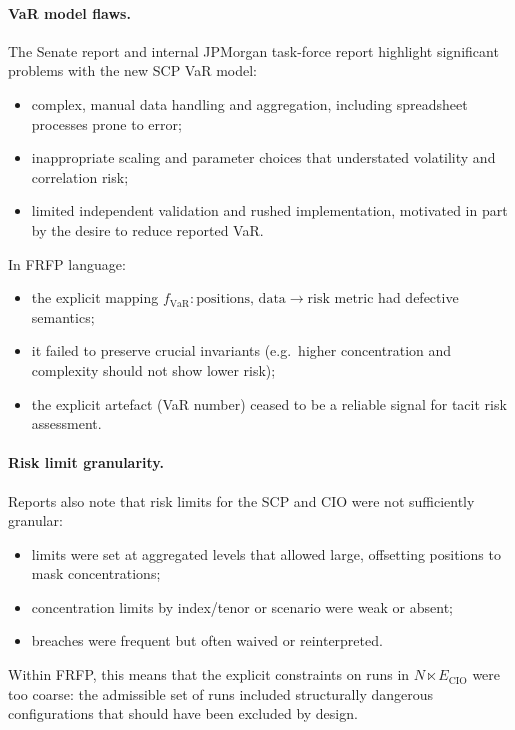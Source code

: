 \paragraph{VaR model flaws.}
The Senate report and internal JPMorgan task-force report highlight
significant problems with the new SCP VaR model:

\begin{itemize}
  \item complex, manual data handling and aggregation, including spreadsheet
        processes prone to error;
  \item inappropriate scaling and parameter choices that understated
        volatility and correlation risk;
  \item limited independent validation and rushed implementation, motivated
        in part by the desire to reduce reported VaR.
\end{itemize}

In FRFP language:

\begin{itemize}
  \item the explicit mapping
        \(
          f_{\mathrm{VaR}} : \text{positions, data} \to \text{risk metric}
        \)
        had defective semantics;
  \item it failed to preserve crucial invariants (e.g.\ higher concentration
        and complexity should not show lower risk);
  \item the explicit artefact (VaR number) ceased to be a reliable signal for
        tacit risk assessment.
\end{itemize}

\paragraph{Risk limit granularity.}
Reports also note that risk limits for the SCP and CIO were not sufficiently
granular:

\begin{itemize}
  \item limits were set at aggregated levels that allowed large, offsetting
        positions to mask concentrations;
  \item concentration limits by index/tenor or scenario were weak or absent;
  \item breaches were frequent but often waived or reinterpreted.
\end{itemize}

Within FRFP, this means that the explicit constraints on runs in
\(N \ltimes E_{\mathrm{CIO}}\) were too coarse: the admissible set of runs
included structurally dangerous configurations that should have been
excluded by design.

